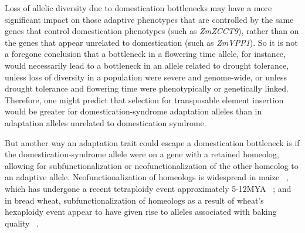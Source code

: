 \documentclass[12pt]{article}
\begin{document}
Loss of allelic diversity due to domestication bottlenecks may have a more significant impact on those adaptive phenotypes that are controlled by the same genes that control domestication phenotypes (such as \textit{ZmZCCT9}), rather than on the genes that appear unrelated to domestication (such as \textit{ZmVPP1}).  So it is not a foregone conclusion that a bottleneck in a flowering time allele, for instance, would necessarily lead to a bottleneck in an allele related to drought tolerance, unless loss of diversity in a population were severe and genome-wide, or unless drought tolerance and flowering time were phenotypically or genetically linked. Therefore, one might predict that selection for transposable element insertion would be greater for domestication-syndrome adaptation alleles than in adaptation alleles unrelated to domestication syndrome.  

But another way an adaptation trait could escape a domestication bottleneck is if the domestication-syndrome allele were on a gene with a retained homeolog, allowing for subfunctionalization or neofunctionalization of the other homeolog to an adaptive allele.  Neofunctionalization of homeologs is widespread in maize ~\citep{Hughes2014}, which has undergone a recent tetraploidy event approximately 5-12MYA ~\citep{Swigonova2004}; and in bread wheat, subfunctionalization of homeologs as a result of  wheat's hexaploidy event appear to have given rise to alleles associated with baking quality ~\citep{Pfeifer2014}.  
\end{document}
